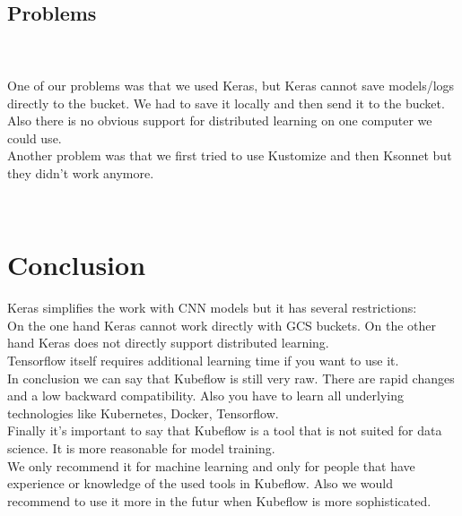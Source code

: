 \documentclass[
	12pt, %
]{fphw}
\begin{document}
\ \\ 
\subsection*{Problems}
\ \\  \ \\
\noindent One of our problems was that we used Keras, but Keras cannot save models/logs directly to the bucket. We had to save it locally and then send it to the bucket. \\
Also there is no obvious support for distributed learning on one computer we could use. \\

\noindent Another problem was that we first tried to use Kustomize and then Ksonnet but they didn't work anymore.

\ \\
\section{Conclusion}

\noindent Keras simplifies the work with CNN models but it has several restrictions: \\
On the one hand Keras cannot work directly with GCS buckets. On the other hand Keras does not directly support distributed learning. \\

\noindent Tensorflow itself requires additional learning time if you want to use it.\\

\noindent In conclusion we can say that Kubeflow is still very raw. There are rapid changes and a low backward compatibility. Also you have to learn all underlying technologies like Kubernetes, Docker, Tensorflow.\\
Finally it's important to say that Kubeflow is a tool that is not suited for data science. It is more reasonable for model training. \\

\noindent We only recommend it for machine learning and only for people that have experience or knowledge of the used tools in Kubeflow. Also we would recommend to use it more in the futur when Kubeflow is more sophisticated.
\ \\
{}

\end{document}

